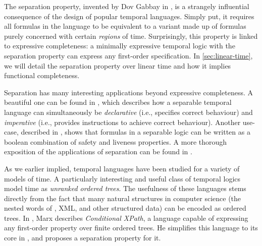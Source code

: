 \documentclass[a4paper,UKenglish,cleveref, autoref, thm-restate, numberwithinsect]{lipics-v2021}
\begin{document}
The separation property, invented by Dov Gabbay in \cite{Gabbay1981}, is a strangely influential consequence of the design of popular temporal languages. Simply put, it requires all formulas in the language to be equivalent to a variant made up of formulas purely concerned with certain \textit{regions} of time. Surprisingly, this property is linked to expressive completeness: a minimally expressive temporal logic with the separation property can express any first-order specification. In \cref{sec:linear-time}, we will detail the separation property over linear time and how it implies functional completeness.


Separation has many interesting applications beyond expressive completeness. A beautiful one can be found in \cite{DecPastImpFuture89}, which describes how a separable temporal language can simultaneously be \textit{declarative} (i.e., specifies correct behaviour) and \textit{imperative} (i.e., provides instructions to achieve correct behaviour). Another use-case, described in \cite{Lichtenstein1985TheGO}, shows that formulas in a separable logic can be written as a boolean combination of safety and liveness properties. A more thorough exposition of the applications of separation can be found in \cite{GabbayBirthday05}.

As we earlier implied, temporal languages have been studied for a variety of models of time. A particularly interesting and useful class of temporal logics model time as \textit{unranked ordered trees}. The usefulness of these languages stems directly from the fact that many natural structures in computer science (the nested words of \cite{alur2009}, XML, and other structured data) can be encoded as ordered trees. In \cite{marx2005conditional}, Marx describes \textit{Conditional XPath}, a language capable of expressing any first-order property over finite ordered trees. He simplifies this language to its core in \cite{xpathComplete}, and proposes a separation property for it.
\end{document}
